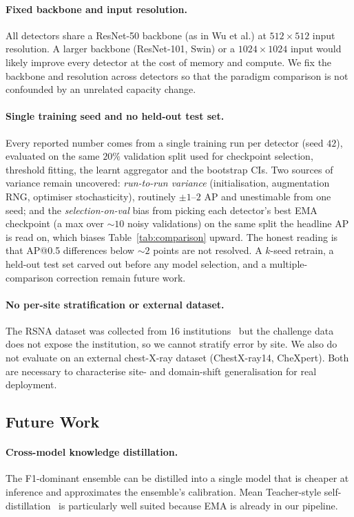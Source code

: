 \documentclass[11pt,a4paper]{article}
\begin{document}
\paragraph{Fixed backbone and input resolution.}
All detectors share a ResNet-50 backbone (as in Wu et al.) at $512 \times 512$ input resolution. A larger backbone (ResNet-101, Swin) or a $1024 \times 1024$ input would likely improve every detector at the cost of memory and compute. We fix the backbone and resolution across detectors so that the paradigm comparison is not confounded by an unrelated capacity change.

\paragraph{Single training seed and no held-out test set.}
Every reported number comes from a single training run per detector (seed $42$), evaluated on the same $20\%$ validation split used for checkpoint selection, threshold fitting, the learnt aggregator and the bootstrap CIs. Two sources of variance remain uncovered: \emph{run-to-run variance} (initialisation, augmentation RNG, optimiser stochasticity), routinely $\pm 1$--$2$ AP and unestimable from one seed; and the \emph{selection-on-val} bias from picking each detector's best EMA checkpoint (a max over $\sim\!10$ noisy validations) on the same split the headline AP is read on, which biases Table~\ref{tab:comparison} upward. The honest reading is that AP@0.5 differences below $\sim 2$ points are not resolved. A $k$-seed retrain, a held-out test set carved out before any model selection, and a multiple-comparison correction remain future work.

\paragraph{No per-site stratification or external dataset.}
The RSNA dataset was collected from 16 institutions~\cite{shih2019rsna} but the challenge data does not expose the institution, so we cannot stratify error by site. We also do not evaluate on an external chest-X-ray dataset (ChestX-ray14, CheXpert). Both are necessary to characterise site- and domain-shift generalisation for real deployment.

\subsection{Future Work}

\paragraph{Cross-model knowledge distillation.}
The F1-dominant ensemble can be distilled into a single model that is cheaper at inference and approximates the ensemble's calibration. Mean Teacher-style self-distillation~\cite{tarvainen2017mean} is particularly well suited because EMA is already in our pipeline.
\end{document}
